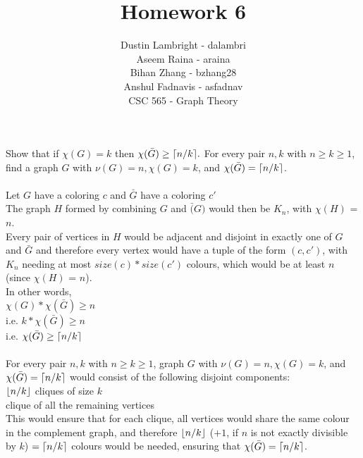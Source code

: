 \documentclass[12pt]{article}
\DeclarePairedDelimiter{\ceil}{\lceil}{\rceil}
\DeclarePairedDelimiter{\floor}{\lfloor}{\rfloor}
\newenvironment{question}[2][Question]{\begin{trivlist}
\item[\hskip \labelsep {\bfseries #1}\hskip \labelsep {\bfseries #2.}]}{\end{trivlist}}
\begin{document}


\title{Homework 6}%
\author{Dustin Lambright - dalambri \\ Aseem Raina - araina \\ Bihan Zhang - bzhang28 \\ Anshul Fadnavis - asfadnav\\
CSC 565 - Graph Theory} %

\maketitle


\begin{question}{3}
Show that if $\chi(G) = k$ then $\chi(\bar{G}) \geq \ceil[big]{n/k}.$ For every pair $n, k$ with $n \geq k \geq 1$, find a graph $G$ with $ν(G) = n, \chi(G) = k$, and $\chi(\bar{G}) = \ceil[big]{n/k}$.\\
\\
Let $G$ have a coloring $c$ and $\bar{G}$ have a coloring $c'$\\
The graph $H$ formed by combining $G$ and $\bar(G)$ would then be $K_n$, with $\chi(H)$ = $n$.
\\
Every pair of vertices in $H$ would be adjacent and disjoint in exactly one of $G$ and $\bar{G}$ and therefore every vertex would have a tuple of the form $(c, c')$, with $K_n$ needing at most $size(c) * size(c')$ colours, which would be at least $n$ (since $\chi(H)$ = $n$).\\
In other words,\\
\indent $\chi(G) * \chi(\bar{G}) \geq n$\\
i.e.	$k * \chi(\bar{G}) \geq n$\\
i.e.	$\chi(\bar{G}) \geq \ceil[big]{n/k}$\\
\\
For every pair $n, k$ with $n \geq k \geq 1$, graph $G$ with $ν(G) = n, \chi(G) = k$, and $\chi(\bar{G}) = \ceil[big]{n/k}$ would consist of the following disjoint components:\\
\indent $\floor{n/k}$ cliques of size $k$\\
 clique of all the remaining vertices\\
This would ensure that for each clique, all vertices would share the same colour in the complement graph, and therefore $\floor{n/k}$ ($+1$, if $n$ is not exactly divisible by $k$) $= \ceil[big]{n/k}$ colours would be needed, ensuring that $\chi(\bar{G}) = \ceil[big]{n/k}$.

\end{question}
\end{document}
